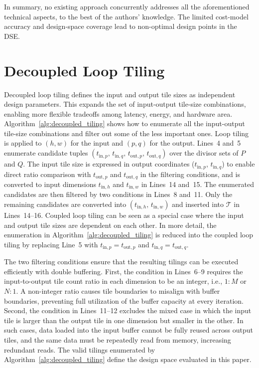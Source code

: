 \documentclass[lettersize,journal]{IEEEtran}
\begin{document}
In summary, no existing approach concurrently addresses all the aforementioned technical aspects, to the best of the authors' knowledge. The limited cost-model accuracy and design-space coverage lead to non-optimal design points in the DSE.


\section{Decoupled Loop Tiling}
\label{sec:decoupled_tiling}

Decoupled loop tiling defines the input and output tile sizes as independent design parameters.
This expands the set of input-output tile-size combinations, enabling more flexible tradeoffs among latency, energy, and hardware area.
Algorithm~\ref{alg:decoupled_tiling} shows how to enumerate all the input-output tile-size combinations and filter out some of the less important ones.
Loop tiling is applied to $(h, w)$ for the input and $(p, q)$ for the output.
Lines~4 and~5 enumerate candidate tuples $(t_{\mathrm{in},p},\, t_{\mathrm{in},q},\, t_{\mathrm{out},p},\, t_{\mathrm{out},q})$ over the divisor sets of $P$ and $Q$.
The input tile size is expressed in output coordinates ($t_{\mathrm{in},p}$, $t_{\mathrm{in},q}$) to enable direct ratio comparison with $t_{\mathrm{out},p}$ and $t_{\mathrm{out},q}$ in the filtering conditions, and is converted to input dimensions $t_{\mathrm{in},h}$ and $t_{\mathrm{in},w}$ in Lines~14 and~15.
The enumerated candidates are then filtered by two conditions in Lines~8 and~11.
Only the remaining candidates are converted into $(t_{\mathrm{in},h},\, t_{\mathrm{in},w})$ and inserted into $\mathcal{T}$ in Lines~14--16.
Coupled loop tiling can be seen as a special case where the input and output tile sizes are dependent on each other. In more detail, the enumeration in Algorithm~\ref{alg:decoupled_tiling} is reduced into the coupled loop tiling by replacing Line~5 with $t_{\mathrm{in},p} = t_{\mathrm{out},p}$ and $t_{\mathrm{in},q} = t_{\mathrm{out},q}$.

The two filtering conditions ensure that the resulting tilings can be executed efficiently with double buffering.
First, the condition in Lines~6--9 requires the input-to-output tile count ratio in each dimension to be an integer, i.e., $1{:}M$ or $N{:}1$.
A non-integer ratio causes tile boundaries to misalign with buffer boundaries, preventing full utilization of the buffer capacity at every iteration.
Second, the condition in Lines~11--12 excludes the mixed case in which the input tile is larger than the output tile in one dimension but smaller in the other.
In such cases, data loaded into the input buffer cannot be fully reused across output tiles, and the same data must be repeatedly read from memory, increasing redundant reads.
The valid tilings enumerated by Algorithm~\ref{alg:decoupled_tiling} define the design space evaluated in this paper.
\end{document}
